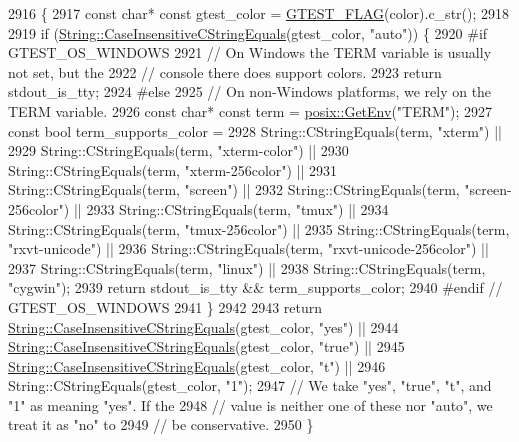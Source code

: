 \begin{DoxyCode}
2916                                         \{
2917   \textcolor{keyword}{const} \textcolor{keywordtype}{char}* \textcolor{keyword}{const} gtest\_color = \hyperlink{gtest-port_8h_a828f4e34a1c4b510da50ec1563e3562a}{GTEST\_FLAG}(color).c\_str();
2918 
2919   \textcolor{keywordflow}{if} (\hyperlink{namespacetesting_1_1internal_aebfd0cd34de52d7973a5b2d03ba848cf}{String::CaseInsensitiveCStringEquals}(gtest\_color, \textcolor{stringliteral}{"auto"})) \{
2920 \textcolor{preprocessor}{#if GTEST\_OS\_WINDOWS}
2921     \textcolor{comment}{// On Windows the TERM variable is usually not set, but the}
2922     \textcolor{comment}{// console there does support colors.}
2923     \textcolor{keywordflow}{return} stdout\_is\_tty;
2924 \textcolor{preprocessor}{#else}
2925     \textcolor{comment}{// On non-Windows platforms, we rely on the TERM variable.}
2926     \textcolor{keyword}{const} \textcolor{keywordtype}{char}* \textcolor{keyword}{const} term = \hyperlink{namespacetesting_1_1internal_1_1posix_a1d5e3da5a27eed25986859fa83cafe95}{posix::GetEnv}(\textcolor{stringliteral}{"TERM"});
2927     \textcolor{keyword}{const} \textcolor{keywordtype}{bool} term\_supports\_color =
2928         String::CStringEquals(term, \textcolor{stringliteral}{"xterm"}) ||
2929         String::CStringEquals(term, \textcolor{stringliteral}{"xterm-color"}) ||
2930         String::CStringEquals(term, \textcolor{stringliteral}{"xterm-256color"}) ||
2931         String::CStringEquals(term, \textcolor{stringliteral}{"screen"}) ||
2932         String::CStringEquals(term, \textcolor{stringliteral}{"screen-256color"}) ||
2933         String::CStringEquals(term, \textcolor{stringliteral}{"tmux"}) ||
2934         String::CStringEquals(term, \textcolor{stringliteral}{"tmux-256color"}) ||
2935         String::CStringEquals(term, \textcolor{stringliteral}{"rxvt-unicode"}) ||
2936         String::CStringEquals(term, \textcolor{stringliteral}{"rxvt-unicode-256color"}) ||
2937         String::CStringEquals(term, \textcolor{stringliteral}{"linux"}) ||
2938         String::CStringEquals(term, \textcolor{stringliteral}{"cygwin"});
2939     \textcolor{keywordflow}{return} stdout\_is\_tty && term\_supports\_color;
2940 \textcolor{preprocessor}{#endif  // GTEST\_OS\_WINDOWS}
2941   \}
2942 
2943   \textcolor{keywordflow}{return} \hyperlink{namespacetesting_1_1internal_aebfd0cd34de52d7973a5b2d03ba848cf}{String::CaseInsensitiveCStringEquals}(gtest\_color, \textcolor{stringliteral}{"yes"}) ||
2944       \hyperlink{namespacetesting_1_1internal_aebfd0cd34de52d7973a5b2d03ba848cf}{String::CaseInsensitiveCStringEquals}(gtest\_color, \textcolor{stringliteral}{"true"}) ||
2945       \hyperlink{namespacetesting_1_1internal_aebfd0cd34de52d7973a5b2d03ba848cf}{String::CaseInsensitiveCStringEquals}(gtest\_color, \textcolor{stringliteral}{"t"}) ||
2946       String::CStringEquals(gtest\_color, \textcolor{stringliteral}{"1"});
2947   \textcolor{comment}{// We take "yes", "true", "t", and "1" as meaning "yes".  If the}
2948   \textcolor{comment}{// value is neither one of these nor "auto", we treat it as "no" to}
2949   \textcolor{comment}{// be conservative.}
2950 \}
\end{DoxyCode}

